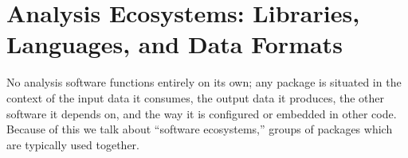 

\section{Analysis Ecosystems: Libraries, Languages, and Data Formats}
No analysis software functions entirely on its own; any package is situated in the context of the input data it consumes, the output data it produces, the other software it depends on, and the way it is configured or embedded in other code. Because of this we talk about ``software ecosystems,'' groups of packages which are typically used together.

